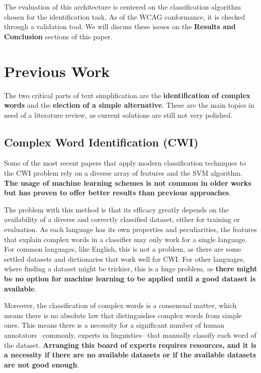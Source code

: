 \documentclass[11pt,a4paper]{article}
\begin{document}
The evaluation of this architecture is centered on the classification algorithm chosen for the identification task. As of the WCAG conformance, it is checked through a validation tool. We will discuss these issues on the \textbf{Results and Conclusion} sections of this paper.

\section{Previous Work}

The two critical parts of text simplification are the \textbf{identification of complex words} and the \textbf{election of a simple alternative}. These are the main topics in need of a literature review, as current solutions are still not very polished.

\subsection{Complex Word Identification (CWI)}

Some of the most recent papers that apply modern classification techniques to the CWI problem rely on a diverse array of features and the SVM algorithm. \textbf{The usage of machine learning schemes is not common in older works but has proven to offer better results than previous approaches}.

The problem with this method is that its efficacy greatly depends on the availability of a diverse and correctly classified dataset, either for training or evaluation. As each language has its own properties and peculiarities, the features that explain complex words in a classifier may only work for a single language. For common languages, like English, this is not a problem, as there are some settled datasets and dictionaries that work well for CWI. For other languages, where finding a dataset might be trickier, this is a huge problem, as \textbf{there might be no option for machine learning to be applied until a good dataset is available}.

Moreover, the classification of complex words is a consensual matter, which means there is no absolute law that distinguishes complex words from simple ones. This means there is a necessity for a significant number of human annotators –commonly, experts in linguistics– that manually classify each word of the dataset. \textbf{Arranging this board of experts requires resources, and it is a necessity if there are no available datasets or if the available datasets are not good enough}.
\end{document}
